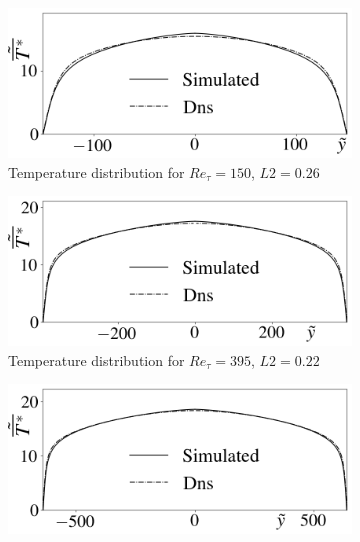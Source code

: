 \documentclass[10pt]{article} %
\begin{document}
\begin{figure}[!h]
	\centering
	\begin{subfigure}[t]{0.5\textwidth}
		\centering
		\includegraphics[angle=0, scale=0.24]{fotos_formatacao_final/Temperature_150_071_Prt(Ret)_A26}
		\caption{Temperature distribution for $Re_\tau = 150$, $L2 = 0.26$}
	\end{subfigure}
	\begin{subfigure}[t]{0.45\textwidth}
		\centering
		\includegraphics[angle=0, scale=0.24]{fotos_formatacao_final/Temperature_395_071_Prt(Ret)_A26}
		\caption{Temperature distribution for $Re_\tau = 395$, $L2 = 0.22$}
	\end{subfigure}
	\begin{subfigure}[t]{0.5\textwidth}
		\centering
		\includegraphics[angle=0, scale=0.24]{fotos_formatacao_final/Temperature_640_071_Prt(Ret)_A26}

\end{subfigure}
\end{figure}
\end{document}
